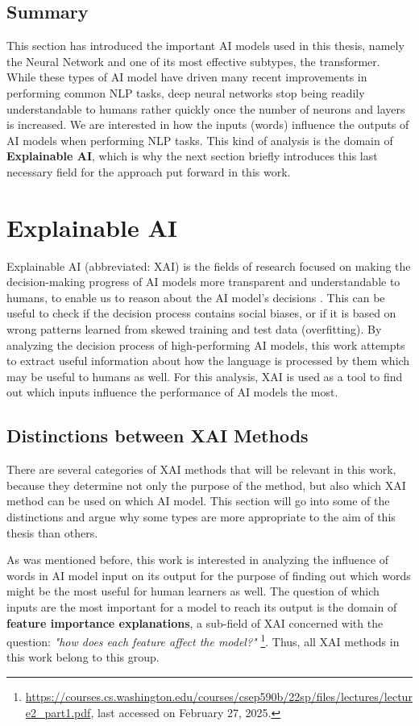 \subsection{Summary}
This section has introduced the important AI models used in this thesis, namely the Neural Network and one of its most effective subtypes, the transformer.
While these types of AI model have driven many recent improvements in performing common NLP tasks, deep neural networks stop being readily understandable to humans rather quickly once the number of neurons and layers is increased.
We are interested in how the inputs (words) influence the outputs of AI models when performing NLP tasks.
This kind of analysis is the domain of \textbf{Explainable AI}, which is why the next section briefly introduces this last necessary field for the approach put forward in this work.

\section{Explainable AI} \label{sec:explainable-ai}
Explainable AI (abbreviated: XAI) is the fields of research focused on making the decision-making progress of AI models more transparent and understandable to humans, to enable us to reason about the AI model's decisions \cite{viloneNotionsExplainabilityEvaluation2021}.
This can be useful to check if the decision process contains social biases, or if it is based on wrong patterns learned from skewed training and test data (overfitting).
By analyzing the decision process of high-performing AI models, this work attempts to extract useful information about how the language is processed by them which may be useful to humans as well.
For this analysis, XAI is used as a tool to find out which inputs influence the performance of AI models the most.

\subsection{Distinctions between XAI Methods}
There are several categories of XAI methods that will be relevant in this work, because they determine not only the purpose of the method, but also which XAI method can be used on which AI model.
This section will go into some of the distinctions and argue why some types are more appropriate to the aim of this thesis than others.

As was mentioned before, this work is interested in analyzing the influence of words in AI model input on its output for the purpose of finding out which words might be the most useful for human learners as well.
The question of which inputs are the most important for a model to reach its output is the domain of \textbf{feature importance explanations}, a sub-field of XAI concerned with the question: \textit{"how does each feature affect the model?"} \footnote{\url{https://courses.cs.washington.edu/courses/csep590b/22sp/files/lectures/lecture2_part1.pdf}, last accessed on February 27, 2025.}.
Thus, all XAI methods in this work belong to this group.

